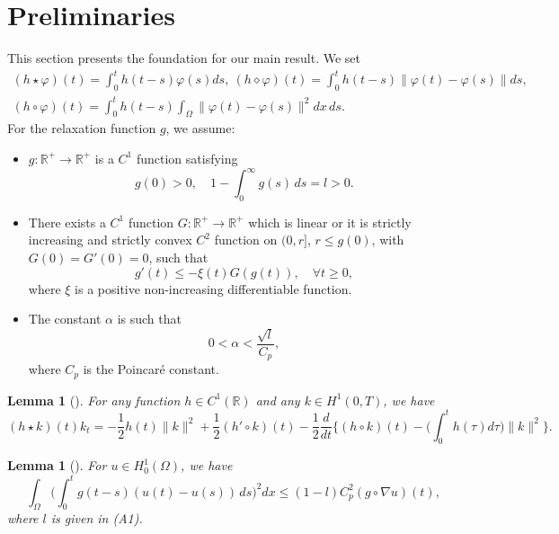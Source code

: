 \documentclass[11pt]{article}
\numberwithin{equation}{section}
\newtheorem{lemma}[theorem]{Lemma}
\begin{document}
 \section{Preliminaries}

 This section presents the foundation for our main result. We set
 \begin{gather*}
 (h \star \varphi)(t) = \int_0^t h(t-s) \varphi(s)ds,\
 (h \diamond \varphi)(t) = \int_0^t h(t-s)\| \varphi(t)- \varphi(s)\| ds, \\
 (h \circ \varphi)(t) = \int_0^t h(t-s)\int_\Omega\| \varphi(t)- \varphi(s)\|^2 dx \, ds.
 \end{gather*}
 For the relaxation function $g$, we assume:
 \begin{itemize}
\item[(A1)] $g: \mathbb{R}^+ \to \mathbb{R}^+ $ is a $ C^1$ function satisfying\\
\begin{equation*}
 g(0) > 0, \quad 1-\int_0^{\infty} g(s) \, ds = l > 0. \label{e2.1}
\end{equation*}

\item[(A2)] There exists a $C^1$ function $G :\mathbb{R}^+ \to \mathbb{R}^+ $
which is linear or it is strictly increasing and strictly convex $C^2$ function on
$(0, r]$, $r \leq g(0)$, with $G(0) = G'(0) = 0$, such that
\begin{equation} \label{e2.2}
g'(t) \leq -\xi(t) G(g(t)),\quad \forall t \geq 0,
\end{equation}
where $\xi$ is a positive non-increasing differentiable function.

\item[(A3)] The constant $\alpha $ is such that
\begin{equation} \label{e2.3}
0 < \alpha < \frac{\sqrt{l} }{C_p},
\end{equation}
where $C_p$ is the Poincar\'e constant.
\end{itemize}

\begin{lemma}[\cite{Munoz}] \label{lem1}
For any function $h \in C^1 (\mathbb{R})$ and any $k \in H^1 (0,T)$, we have
$$
(h \star k)(t) k_t
 = -\frac{1}{2} h(t)  \| k\|^2 + \frac{1}{2} (h' \circ k)(t)
 -\frac{1}{2} \frac{d}{dt} \Big\{( h \circ k)(t)
 - \Big( \int_0^t h(\tau) d\tau \Big) \|k\|^2 \Big\}.
$$
\end{lemma}

\begin{lemma}[\cite{SMessaoudi1}] \label{lem2}
 For $u \in H^1_0(\Omega)$, we have
\begin{equation}
\int_\Omega \Big( \int_0^t g(t - s)(u(t) - u(s)) \, ds \Big)^2 dx
\leq (1 - l) C_p^2 (g \circ \nabla u)(t),\label{e2.4}
\end{equation}
where $l$ is given in {\rm (A1)}.
\end{lemma}
\end{document}
